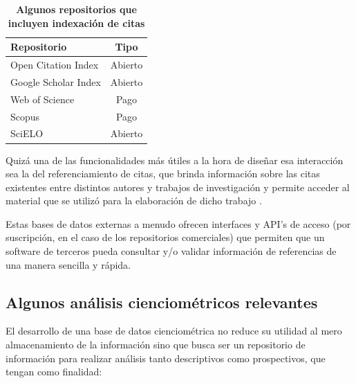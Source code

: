 \begin{table}[ht]
	\centering	
	\caption{\textbf{Algunos repositorios que incluyen indexación de citas}}
	\begin{tabularx}{.8\linewidth}{Xc}
		\toprule
		\textbf{Repositorio}&\textbf{Tipo}\\
		\midrule
		Open Citation Index&Abierto\\
		Google Scholar Index&Abierto\\
		Web of Science&Pago\\
		Scopus&Pago\\
		SciELO&Abierto\\
		\bottomrule
	\end{tabularx}
	
	\label{tab:repositorios}
\end{table}%

Quizá una de las funcionalidades más útiles a la hora de diseñar esa interacción sea la del referenciamiento de citas, que brinda información sobre las citas existentes entre distintos autores y trabajos de investigación y permite acceder al material que se utilizó para la elaboración de dicho trabajo \cite{harzing2008google,bakkalbasi2006three}.

Estas bases de datos externas a menudo ofrecen interfaces y API's de acceso (por suscripción, en el caso de los repositorios comerciales) que permiten que un software de terceros pueda consultar y/o validar información de referencias de una manera sencilla y rápida.

\subsection{Algunos análisis cienciométricos relevantes}

El desarrollo de una base de datos cienciométrica no reduce su utilidad al mero almacenamiento de la información sino que busca ser un repositorio de información para realizar análisis tanto descriptivos como prospectivos, que tengan como finalidad:

